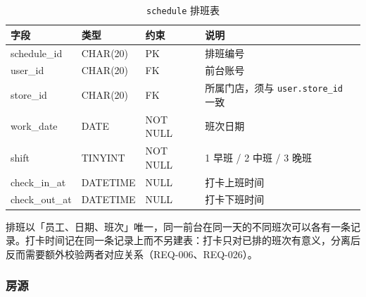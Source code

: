 \begin{table}[H]
\centering
\caption{\texttt{schedule} 排班表}
\tabfont
\begin{tabularx}{\textwidth}{@{}L{2.7cm}L{2.9cm}L{2.6cm}X@{}}
\toprule
字段 & 类型 & 约束 & 说明 \\
\midrule
schedule\_id & CHAR(20) & PK & 排班编号 \\
user\_id & CHAR(20) & FK & 前台账号 \\
store\_id & CHAR(20) & FK & 所属门店，须与 \texttt{user.store\_id} 一致 \\
work\_date & DATE & NOT NULL & 班次日期 \\
shift & TINYINT & NOT NULL & 1 早班 / 2 中班 / 3 晚班 \\
check\_in\_at & DATETIME & NULL & 打卡上班时间 \\
check\_out\_at & DATETIME & NULL & 打卡下班时间 \\
\bottomrule
\end{tabularx}
\end{table}

排班以「员工、日期、班次」唯一，同一前台在同一天的不同班次可以各有一条记录。打卡时间记在同一条记录上而不另建表：打卡只对已排的班次有意义，分离后反而需要额外校验两者对应关系（REQ-006、REQ-026）。

\subsubsection{房源}

